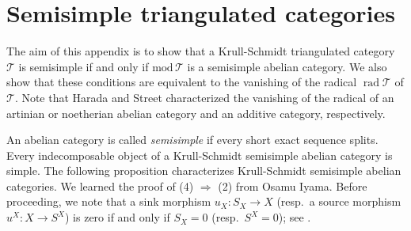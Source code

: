 \documentclass[12pt]{amsart}
\numberwithin{equation}{subsection}
\theoremstyle{plain}
\theoremstyle{definition}
\newcommand{\rad}{\operatorname{rad}}
\renewcommand{\mod}{\mathrm{mod}\,}
\newcommand{\T}{\mathcal{T}}
\begin{document}
\section{Semisimple triangulated categories} 
\label{Semisimple_triangulated_categories} 





The aim of this appendix is to show that a Krull-Schmidt triangulated category $\T$ is semisimple if and only if $\mod\T$ is a semisimple abelian category.
We also show that these conditions are equivalent to the vanishing of the radical $\rad\T$ of $\T$. 
Note that Harada \cite[Theorem 1.2]{Harada_1970} and Street \cite[Proposition 11]{Street_1995}  characterized the vanishing of the radical of an artinian or noetherian abelian category and an additive category, respectively. 






An abelian category is called {\it semisimple} if every short exact sequence splits. 
Every indecomposable object of a Krull-Schmidt semisimple abelian category is simple.
The following proposition characterizes Krull-Schmidt semisimple abelian categories. 
We learned the proof of (4) $\Rightarrow$ (2) from Osamu Iyama.
Before proceeding, we note that a sink morphism $u_X: S_X \to X$  (resp.~a source morphism $u^X: X \to S^X$) is zero if and only if $S_X=0$ (resp.~$S^X=0$); see \cite[Lemma 1.1]{ShipingLiu_2010}.
\end{document}
